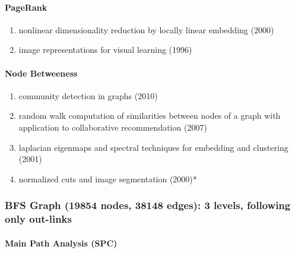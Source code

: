 \documentclass[lettepaper,]{article}
\providecommand{\tightlist}{%
  \setlength{\itemsep}{0pt}\setlength{\parskip}{0pt}}
\let\oldparagraph\paragraph
\renewcommand{\paragraph}[1]{\oldparagraph{#1}\mbox{}}
\begin{document}
\hypertarget{pagerank-2}{%
\paragraph{PageRank}\label{pagerank-2}}

\begin{enumerate}
\def\labelenumi{\arabic{enumi}.}
\tightlist
\item
  nonlinear dimensionality reduction by locally linear embedding (2000)
\item
  image representations for visual learning (1996)
\end{enumerate}

\hypertarget{node-betweeness-1}{%
\paragraph{Node Betweeness}\label{node-betweeness-1}}

\begin{enumerate}
\def\labelenumi{\arabic{enumi}.}
\tightlist
\item
  community detection in graphs (2010)
\item
  random walk computation of similarities between nodes of a graph with
  application to collaborative recommendation (2007)
\item
  laplacian eigenmaps and spectral techniques for embedding and
  clustering (2001)
\item
  normalized cuts and image segmentation (2000)*
\end{enumerate}

\hypertarget{bfs-graph-19854-nodes-38148-edges-3-levels-following-only-out-links}{%
\subsubsection{BFS Graph (19854 nodes, 38148 edges): 3 levels, following
only
out-links}\label{bfs-graph-19854-nodes-38148-edges-3-levels-following-only-out-links}}

\hypertarget{main-path-analysis-spc}{%
\paragraph{Main Path Analysis (SPC)}\label{main-path-analysis-spc}}
\end{document}
